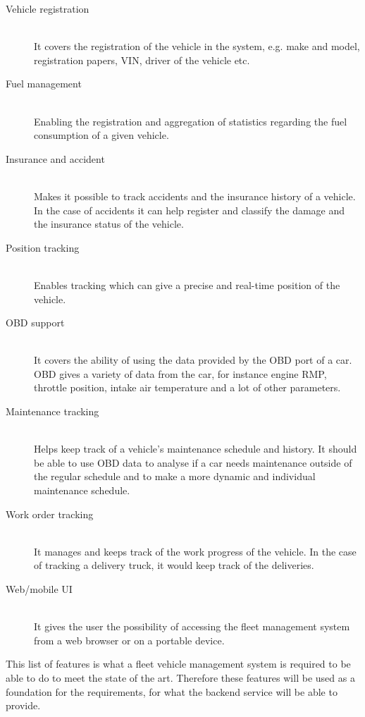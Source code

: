 \begin{description}
    \item[Vehicle registration] \hfill \\
    It covers the registration of the vehicle in the system, e.g. make and model, registration papers, \ac{VIN}, driver of the vehicle etc.
    \item[Fuel management] \hfill \\
    Enabling the registration and aggregation of statistics regarding the fuel consumption of a given vehicle.     
    \item[Insurance and accident] \hfill \\
    Makes it possible to track accidents and the insurance history of a vehicle. In the case of accidents it can help register and classify the damage and the insurance status of the vehicle. 
    \item[Position tracking] \hfill \\
    Enables tracking which can give a precise and real-time position of the vehicle. 
    \item[\ac{OBD} support] \hfill \\
    It covers the ability of using the data provided by the \ac{OBD} port of a car. \ac{OBD} gives a variety of data from the car, for instance engine RMP, throttle position, intake air temperature and a lot of other parameters\cite{wiki_obd}. 
    \item[Maintenance tracking] \hfill \\
    Helps keep track of a vehicle's maintenance schedule and history. It should be able to use \ac{OBD} data to analyse if a car needs maintenance outside of the regular schedule and to make a more dynamic and individual maintenance schedule.
    \item[Work order tracking] \hfill \\
    It manages and keeps track of the work progress of the vehicle. In the case of tracking a delivery truck, it would keep track of the deliveries.
    \item[Web/mobile UI] \hfill \\
    It gives the user the possibility of accessing the fleet management system from a web browser or on a portable device. 
\end{description}

This list of features is what a fleet vehicle management system is required to be able to do to meet the state of the art.
Therefore these features will be used as a foundation for the requirements, for what the backend service will be able to provide.

